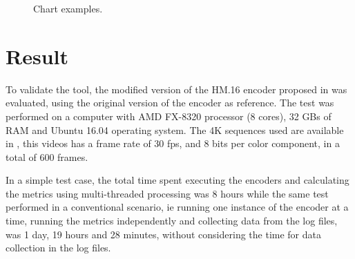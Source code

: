 \documentclass[journal]{IEEEtran}
\begin{document}
\FloatBarrier
\begin{figure}[!htb]
	\centering
	\caption{Chart examples.}
	\quad %
\end{figure}
\FloatBarrier


\section{Result}

To validate the tool, the modified version of the HM.16 encoder proposed in \cite{oliveira:16} was evaluated, using the original version of the encoder as reference. The test was performed on a computer with AMD FX-8320 processor (8 cores), 32 GBs of RAM and Ubuntu 16.04 operating system. The 4K sequences used are available in \cite{sjtu:17}, this videos has a frame rate of 30 fps, and 8 bits per color component, in a total of 600 frames.

In a simple test case, the total time spent executing the encoders and calculating the metrics using multi-threaded processing was 8  hours while the same test performed in a conventional scenario, ie running one instance of the encoder at a time, running the metrics independently and collecting data from the log files, was 1 day, 19 hours and 28 minutes, without considering the time for data collection in the log files.
\end{document}
